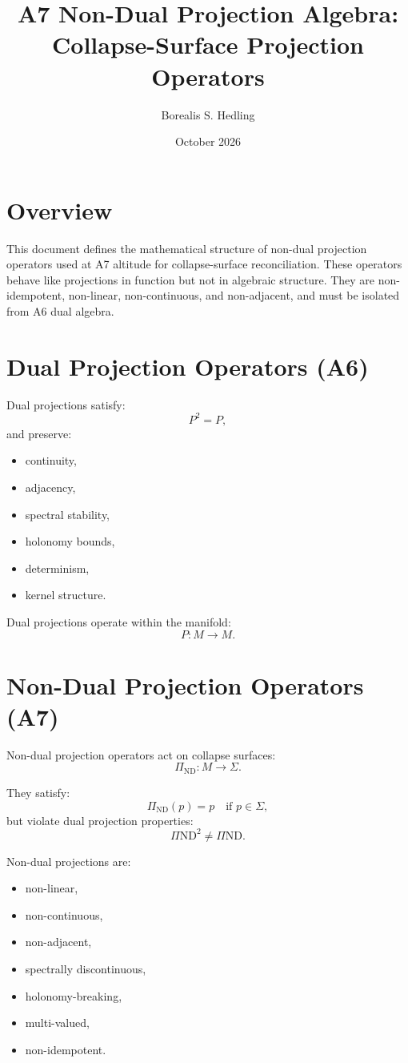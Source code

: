 \documentclass[11pt]{article}
\title{A7 Non-Dual Projection Algebra: Collapse-Surface Projection Operators}
\author{Borealis S. Hedling}
\date{October 2026}
\begin{document}
\maketitle

\section*{Overview}

This document defines the mathematical structure of non-dual projection
operators used at A7 altitude for collapse-surface reconciliation. These
operators behave like projections in function but not in algebraic structure.
They are non-idempotent, non-linear, non-continuous, and non-adjacent, and must
be isolated from A6 dual algebra.

\section{Dual Projection Operators (A6)}

Dual projections satisfy:
\[
P^2 = P,
\]
and preserve:
\begin{itemize}
  \item continuity,
  \item adjacency,
  \item spectral stability,
  \item holonomy bounds,
  \item determinism,
  \item kernel structure.
\end{itemize}

Dual projections operate within the manifold:
\[
P : M \to M.
\]

\section{Non-Dual Projection Operators (A7)}

Non-dual projection operators act on collapse surfaces:
\[
\Pi_{\mathrm{ND}} : M \to \Sigma.
\]

They satisfy:
\[
\Pi_{\mathrm{ND}}(p) = p \quad \text{if } p \in \Sigma,
\]
but violate dual projection properties:
\[
\Pi{\mathrm{ND}}^2 \ne \Pi{\mathrm{ND}}.
\]

Non-dual projections are:
\begin{itemize}
  \item non-linear,
  \item non-continuous,
  \item non-adjacent,
  \item spectrally discontinuous,
  \item holonomy-breaking,
  \item multi-valued,
  \item non-idempotent.
\end{itemize}
\end{document}
